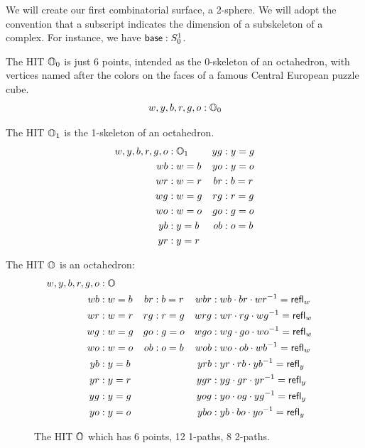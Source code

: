 We will create our first combinatorial surface, a 2-sphere. We will adopt the convention that a subscript indicates the dimension of a subskeleton of a complex. For instance, we have \( \mathsf{base}:S^1_0 \).

\begin{mydef}
The HIT \( \mathbb{O}_0 \) is just 6 points, intended as the 0-skeleton of an octahedron, with vertices named after the colors on the faces of a famous Central European puzzle cube.
\[ w, y, b, r, g, o : \mathbb{O}_0 \]
\end{mydef}

\begin{mydef}
The HIT \( \mathbb{O}_1 \) is the 1-skeleton of an octahedron.
\begin{align*}
w, y, b, r, g, o &: \mathbb{O}_1 & yg &: y=g \\
wb &: w=b & yo &: y=o \\
wr &: w=r & br &: b=r \\
wg &: w=g & rg &: r=g \\
wo &: w=o & go &: g=o \\
yb &: y=b & ob &: o=b \\
yr &: y=r
\end{align*}
\end{mydef}

\begin{mydef}
The HIT \( \mathbb{O} \) is an octahedron:
\begin{align*}
w, y, b, r, g, o &: \mathbb{O} \\
wb &: w=b & br &: b=r & wbr &: wb\cdot br\cdot wr^{-1} = \mathsf{refl}_w \\
wr &: w=r & rg &: r=g & wrg &: wr\cdot rg\cdot wg^{-1} = \mathsf{refl}_w \\
wg &: w=g & go &: g=o & wgo &: wg\cdot go\cdot wo^{-1} = \mathsf{refl}_w \\
wo &: w=o & ob &: o=b & wob &: wo\cdot ob\cdot wb^{-1} = \mathsf{refl}_w \\
yb &: y=b & & & yrb &: yr\cdot rb\cdot yb^{-1} = \mathsf{refl}_y \\
yr &: y=r & & & ygr &: yg\cdot gr\cdot yr^{-1} = \mathsf{refl}_y \\
yg &: y=g & & & yog &: yo\cdot og\cdot yg^{-1} = \mathsf{refl}_y \\
yo &: y=o & & & ybo &: yb\cdot bo\cdot yo^{-1} = \mathsf{refl}_y 
\end{align*}
\end{mydef}

\begin{figure}[htbp]
\centering

\caption{The HIT \( \mathbb{O} \) which has 6 points, 12 1-paths, 8 2-paths.}
\end{figure}

